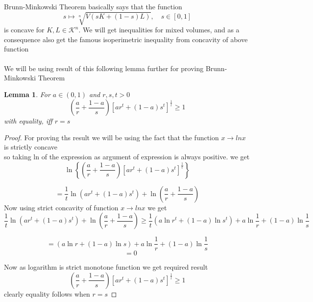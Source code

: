 \documentclass[oneside]{book}
\newtheorem{lemma}[theorem]{Lemma}
\begin{document}
 Brunn-Minkowski Theorem  basically says that the function 
 \[s  \mapsto \sqrt[n]{V(s K+(1- s) L)}, \quad s \in[0,1]
\]
 is concave for $ K, L \in \mathcal{K}^n $.
We will get inequalities for mixed volumes, and as a consequence also get the famous isoperimetric inequality from concavity of above function
\\\\
We will be using result of this following lemma further for proving Brunn-Minkowski Theorem
\begin{lemma} 
\label{l:1}
For $a \in(0,1)$ and $r, s, t>0$
\[
\left(\frac{a}{r}+\frac{1-a}{s}\right)\left[a r^{t}+(1-a) s^{t}\right]^{\frac{1}{t}} \geq 1
\]
with equality, iff $r=s$
\end{lemma} 
 \begin{proof}
 
 For proving ths result we will be using the fact that the function $x \rightarrow lnx $ is strictly concave \\
 so taking ln of the expression as argument of expression is always positive. we get 
 $$\ln \left\{\left(\frac{a}{r}+\frac{1-a}{s}\right)\left[a r^{t}+(1-a) s^{t}\right]^{\frac{1}{t}}\right\}$$
 
$$ =\frac{1}{t} \ln \left(a r^{t}+(1-a) s^{t}\right)+\ln \left(\frac{a}{r}+\frac{1-a}{s}\right)$$
Now using strict concavity of  function  $x \rightarrow lnx $ we get 
$$\frac{1}{t} \ln \left(a r^{t}+(1-a) s^{t}\right)+\ln \left(\frac{a}{r}+\frac{1-a}{s}\right)
  \geq \frac{1}{t}\left(a \ln r^{t}+(1-a) \ln s^{t}\right)+a \ln \frac{1}{r}+(1-a) \ln \frac{1}{s}$$
  
  
$$ =  \left(a \ln r+(1-a) \ln s\right)+a \ln \frac{1}{r}+(1-a) \ln \frac{1}{s}$$
$$\quad = 0$$
 
 Now as logarithm is strict monotone function we get required result 
 \[
\left(\frac{a}{r}+\frac{1-a}{s}\right)\left[a r^{t}+(1-a) s^{t}\right]^{\frac{1}{t}} \geq 1
\]
 clearly equality follows when $r = s $
 \end{proof}
 
 
 
 
 
 
 
 
 
\end{document}
